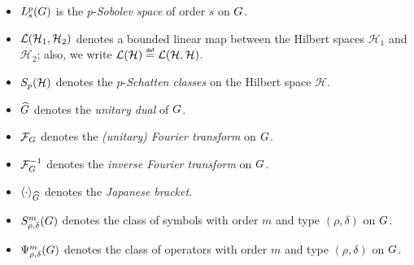 \begin{itemize}
    \item $L^{p}_{s}(G)$ is the $p$-\emph{Sobolev space} of order $s$ on $G$.
    \item ${\mathcal{L} (\mathcal H_1, \mathcal H_2)}$ denotes a bounded linear map between the Hilbert spaces $\mathcal H_1$ and $\mathcal H_2$; also, we write $\Lin {\mathcal H} \defeq \Lin {\mathcal H, \mathcal H}$.
    \item $S_{p}(\mathcal H)$ denotes the $p$-\emph{Schatten classes} on the Hilbert space $\mathcal H$.
    \item ${\widehat{G}}$ denotes the \emph{unitary dual} of $G$.
    \item $\mathcal{F}_{G}$ denotes the \emph{(unitary) Fourier transform} on $G$.
    \item $\mathcal{F}^{-1}_{G}$ denotes the \emph{inverse Fourier transform} on $G$.
    \item ${\langle \cdot \rangle}_{{\widehat{G}}}$ denotes the \emph{Japanese bracket}.
    \item $S^{m}_{\rho, \delta}(G)$ denotes the class of symbols with order $m$ and type $(\rho, \delta)$ on $G$.
    \item $\Psi^{m}_{\rho, \delta}(G)$ denotes the class of operators with order $m$ and type $(\rho, \delta)$ on $G$.
\end{itemize}
